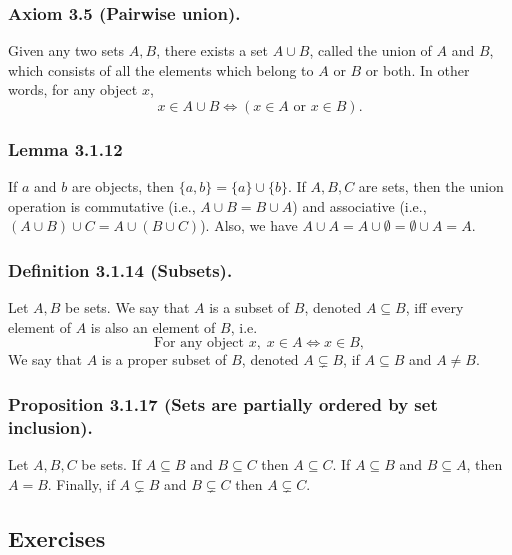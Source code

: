 \documentclass[12pt, letter]{article}
\begin{document}
\subsubsection*{Axiom 3.5 (Pairwise union).}
Given any two sets $A,B$, there exists a set $A\cup B$, called the union of $A$ and $B$, which consists of all the elements which belong to $A$ or $B$ or both. In other words, for any object $x$,
\begin{equation*}
    x\in A\cup B\iff (x\in A \text{ or } x\in B).
\end{equation*}
\subsubsection*{Lemma 3.1.12}
If $a$ and $b$ are objects, then $\{a,b\}=\{a\}\cup\{b\}$. If $A,B,C$ are sets, then the union operation is commutative (i.e., $A\cup B=B\cup A$) and associative (i.e., $(A\cup B)\cup C=A\cup (B\cup C)$). Also,
we have $A\cup A=A\cup\emptyset=\emptyset\cup A=A$.
\subsubsection*{Definition 3.1.14 (Subsets).}
Let $A,B$ be sets. We say that $A$ is a subset of $B$, denoted $A\subseteq B$, iff every element of $A$ is also an element of $B$, i.e.
\begin{equation*}
    \text{For any object }x,\; x\in A\iff x\in B,
\end{equation*} 
We say that $A$ is a proper subset of $B$, denoted $A\subsetneq B$, if $A\subseteq B$ and $A\ne B$.
\subsubsection*{Proposition 3.1.17 (Sets are partially ordered by set inclusion).}
Let $A,B,C$ be sets. If $A\subseteq B$ and $B\subseteq C$ then $A\subseteq C$. If $A\subseteq B$ and $B\subseteq A$, then $A=B$. Finally, if $A\subsetneq B$ and $B\subsetneq C$ then $A\subsetneq C$.



\subsection*{Exercises}
\end{document}
